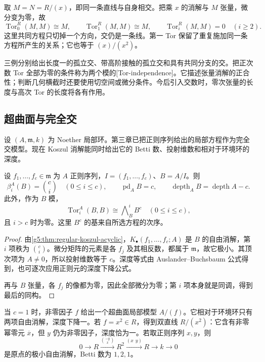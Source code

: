 \begin{example}\label{g5:exm:self-intersection-tor}
	取 \(M=N=R/(x)\)，即同一条直线与自身相交。把乘 \(x\) 的消解与 \(M\) 张量，微分变为零，故
	\[
		\operatorname{Tor}_0^R(M,M)\cong M,\qquad
		\operatorname{Tor}_1^R(M,M)\cong M,\qquad
		\operatorname{Tor}_i^R(M,M)=0\quad(i\geq2).
	\]
	这里共同方程只切掉一个方向，交仍是一条线。第一 Tor 保留了重复施加同一条方程所产生的关系；它也等于 \((x)/(x^2)\)。
\end{example}

三例分别给出长度一的孤立交、带高阶接触的孤立交和具有共同分支的交。把正次数 Tor 全部为零的条件称为两个模的[Tor-independence]。它描述张量消解的正合性；判断几何横截时还要使用切空间或微分条件。今后引入交数时，零次张量的长度与高次 Tor 的长度将各有作用。

\subsection{超曲面与完全交}
\label{g5:subsec:0805:02}

设 \((A,\mathfrak m,k)\) 为 Noether 局部环。第三章已把正则序列给出的局部方程作为完全交模型。现在 Koszul 消解能同时给出它的 Betti 数、投射维数和相对于环境环的深度。

\begin{proposition}\label{g5:prop:complete-intersection-homology}
	设 \(f_1,\ldots,f_c\in\mathfrak m\) 为 \(A\) 正则序列，\(I=(f_1,\ldots,f_c)\)、\(B=A/I\)。则
	\[
		\beta_i^A(B)=\binom ci\quad(0\leq i\leq c),\qquad
		\operatorname{pd}_A B=c,\qquad
		\operatorname{depth}_A B=\operatorname{depth}A-c.
	\]
	此外，作为 \(B\) 模，
	\[
		\operatorname{Tor}_i^A(B,B)
		\cong\bigwedge\nolimits_B^i B^c\quad(0\leq i\leq c),
	\]
	且 \(i>c\) 时为零。这里 \(B^c\) 的基来自所选方程的次序。
\end{proposition}
\begin{proof}
	由\cref{g5:thm:regular-koszul-acyclic}，\(K_\bullet(f_1,\ldots,f_c;A)\) 是 \(B\) 的自由消解，第 \(i\) 项秩为 \(\binom ci\)。微分矩阵的元素是各 \(f_j\) 及其相反数，都属于 \(\mathfrak m\)，故它极小。其顶次项为 \(A\ne0\)，所以投射维数等于 \(c\)。深度等式由 Auslander–Buchsbaum 公式得到，也可逐次应用正则元的深度下降公式。

	再与 \(B\) 张量，各 \(f_j\) 的像都为零，因此全部微分为零；第 \(i\) 项本身就是同调，得到最后的同构。
\end{proof}

当 \(c=1\) 时，非零因子 \(f\) 给出一个超曲面局部模型 \(A/(f)\)。它相对于环境环只有两项自由消解，深度下降一。若 \(f=x^2\in R\)，得到双直线 \(R/(x^2)\)：它含有非零幂零元 \(\overline x\)，但 \(y\) 仍为非零因子，深度恰为一。若取正则序列 \(x,y\)，则
\[
	0\longrightarrow R\xrightarrow{\binom{-y}{x}}R^2
	\xrightarrow{(x\ \ y)}R\longrightarrow k\longrightarrow0
\]
是原点的极小自由消解，Betti 数为 \(1,2,1\)。

